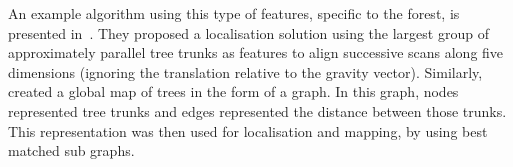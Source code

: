 An example algorithm using this type of features, specific to the forest, is presented in~\citet{Song2012}. They proposed a localisation solution using the largest group of approximately parallel tree trunks as features to align successive scans along five dimensions (ignoring the translation relative to the gravity vector). Similarly, \citet{Miettinen2007} created a global map of trees in the form of a graph. In this graph, nodes represented tree trunks and edges represented the distance between those trunks. This representation was then used for localisation and mapping, by using best matched sub graphs.

